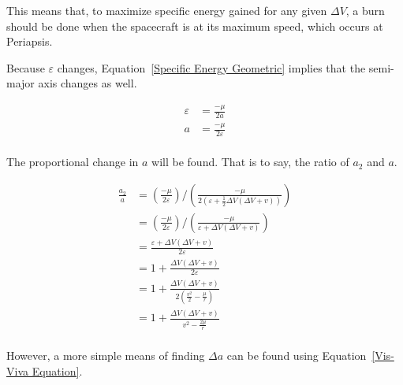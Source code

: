 \documentclass[../basicOrbitalDynamics.tex]{subfiles}
\begin{document}
This means that, to maximize specific energy gained for any given $\Delta V$, a burn should be done when the spacecraft is at its maximum speed, which occurs at Periapsis.

Because $\varepsilon$ changes, Equation~\eqref{Specific Energy Geometric} implies that the semi-major axis changes as well.

\begin{align*}
    \varepsilon & = \frac{-\mu}{2a}           \\
    a           & = \frac{-\mu}{2\varepsilon} \\
\end{align*}

The proportional change in $a$ will be found. That is to say, the ratio of $a_2$ and $a$.

\begin{align*}
    \frac{a_2}{a} & = (\frac{-\mu}{2\varepsilon})/(\frac{-\mu}{2(\varepsilon+\frac{1}{2}\Delta V\left(\Delta V+v\right))})         \\
                  & = \left(\frac{-\mu}{2\varepsilon}\right)/\left(\frac{-\mu}{\varepsilon+\Delta V\left(\Delta V+v\right)}\right) \\
                  & = \frac{\varepsilon+\Delta V\left(\Delta V+v\right)}{2\varepsilon}                                             \\
                  & = 1+\frac{\Delta V\left(\Delta V+v\right)}{2\varepsilon}                                                       \\
                  & = 1+\frac{\Delta V\left(\Delta V+v\right)}{2\left(\frac{v^2}{2}-\frac{\mu{}}{r}\right)}                        \\
                  & = 1+\frac{\Delta V\left(\Delta V+v\right)}{v^2-\frac{2\mu{}}{r}}                                               \\
\end{align*}

However, a more simple means of finding $\Delta a$ can be found using Equation~\eqref{Vis-Viva Equation}.
\end{document}
